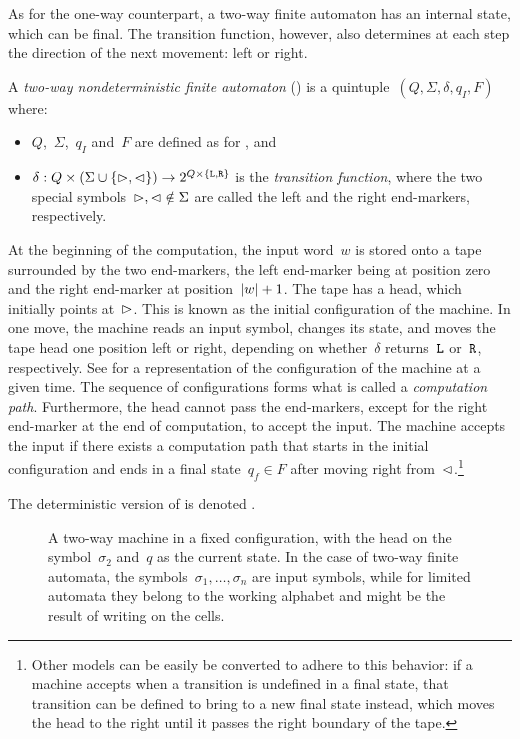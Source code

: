As for the one-way counterpart, a two-way finite automaton has an internal state, which can be final.
The transition function, however, also determines at each step the direction of the next movement: left or right.

\begin{defn}
	A \emph{two-way nondeterministic finite automaton} (\TNFA) is a quintuple~$(Q,\Sigma,\delta,q_I,F)$ where:
	\begin{itemize}
		\item $Q$,~$\Sigma$,~$q_I$ and~$F$ are defined as for \ONFAs, and
		\item $\delta:Q\times(\Sigma\cup\{\rhd,\lhd\})\to2^{Q\times\{\mathtt L,\mathtt R\}}$ is the \emph{transition function}, where the two special symbols~$\rhd,\lhd\notin\Sigma$ are called the left and the right end-markers, respectively.
	\end{itemize}
	At the beginning of the computation, the input word~$w$ is stored onto a tape surrounded by the two end-markers, the left end-marker being at position zero and the right end-marker at position~$\lvert w \rvert+1$.
	The tape has a head, which initially points at~$\rhd$.
	This is known as the initial configuration of the machine.
	In one move, the machine reads an input symbol, changes its state, and moves the tape head one position left or right, depending on whether~$\delta$ returns~$\mathtt L$ or~$\mathtt R$, respectively.
	See  for a representation of the configuration of the machine at a given time.
	The sequence of configurations forms what is called a \emph{computation path}.
	Furthermore, the head cannot pass the end-markers, except for the right end-marker at the end of computation, to accept the input.
	The machine accepts the input if there exists a computation path that starts in the initial configuration and ends in a final state~$q_f\in F$ after moving right from~$\lhd$.\footnote{%
		Other models can be easily be converted to adhere to this behavior: if a machine accepts when a transition is undefined in a final state, that transition can be defined to bring to a new final state instead, which moves the head to the right until it passes the right boundary of the tape.}

	\noindent The deterministic version of \TNFAs is denoted \TDFAs.
\end{defn}

\begin{figure}
	\centering
	
	\caption[Example two-way or limited automaton]{A two-way machine in a fixed configuration, with the head on the symbol~$\sigma_2$ and~$q$ as the current state.
		In the case of two-way finite automata, the symbols~$\sigma_1,\dots,\sigma_n$ are input symbols, while for limited automata they belong to the working alphabet and might be the result of writing on the cells.}
	\label{fig:tapemachine}
\end{figure}

